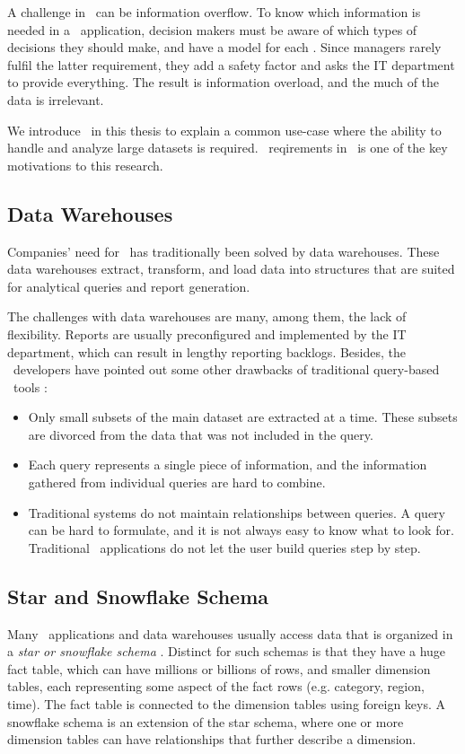 A challenge in \bi~can be information overflow. To know which information is needed in a \bi~application, decision makers must be aware of which types of decisions they should make, and have a model for each \cite{Ackoff1999-wk}. Since managers rarely fulfil the latter requirement, they add a safety factor and asks the IT department to provide everything. The result is information overload, and the much of the data is irrelevant. 

We introduce \bi~in this thesis to explain a common use-case where the ability to handle and analyze large datasets is required. \bi~reqirements in \gap~is one of the key motivations to this research. 

\subsection{Data Warehouses}
\label{sub:Data Warehouses}
Companies' need for \bi~has traditionally been solved by data warehouses. These data warehouses extract, transform, and load data into structures that are suited for analytical queries and report generation.

The challenges with data warehouses are many, among them, the lack of flexibility. Reports are usually preconfigured and implemented by the IT department, which can result in lengthy reporting backlogs. Besides, the \qlikview~developers have pointed out some other drawbacks of traditional query-based \bi~tools \cite{Qlik2010-ya}:
\begin{itemize}
  \item Only small subsets of the main dataset are extracted at a time. These subsets are divorced from the data that was not included in the query.
  \item Each query represents a single piece of information, and the information gathered from individual queries are hard to combine.
  \item Traditional systems do not maintain relationships between queries. A query can be hard to formulate, and it is not always easy to know what to look for. Traditional \bi~applications do not let the user build queries step by step.
\end{itemize}

\subsection{Star and Snowflake Schema}
\label{sub:Star and Snowflake Schema}
Many \bi~applications and data warehouses usually access data that is organized in a \textit{star or snowflake schema} \cite{Barber2012-xt}. Distinct for such schemas is that they have a huge fact table, which can have millions or billions of rows, and smaller dimension tables, each representing some aspect of the fact rows (e.g. category, region, time). The fact table is connected to the dimension tables using foreign keys. A snowflake schema is an extension of the star schema, where one or more dimension tables can have relationships that further describe a dimension.

